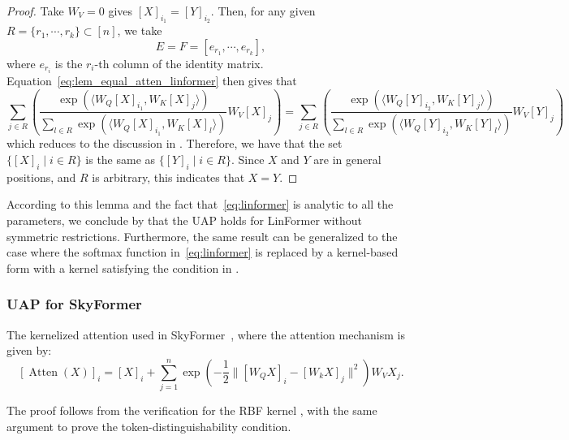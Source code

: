 \documentclass{article}
\begin{document}
\begin{proof}
    Take $W_V=0$ gives $[X]_{i_1}=[Y]_{i_2}$. Then, for any given $R=\{r_1,\cdots, r_k\}\subset [n]$, we take
    \begin{equation}
        E=F=[e_{r_1},\cdots, e_{r_k}],
    \end{equation}
    where $e_{r_i}$ is the $r_i$-th column of the identity matrix. Equation~\eqref{eq:lem_equal_atten_linformer} then gives that
    \begin{equation}
        \sum_{j\in R}\left(\frac{ \exp(\langle W_Q [X]_{i_1}, W_K [X]_j\rangle)}{\sum_{l\in R} \exp(\langle W_Q [X]_{i_1}, W_K [X]_l\rangle)} W_V [X]_j \right) =          \sum_{j\in R}\left(\frac{ \exp(\langle W_Q [Y]_{i_2}, W_K [Y]_j\rangle)}{\sum_{l\in R} \exp(\langle W_Q [Y]_{i_2}, W_K [Y]_l\rangle)} W_V [Y]_j \right)
    \end{equation}
    which reduces to the discussion in . Therefore, we have that the set $\{[X]_{i}\mid i\in R\}$ is the same as $\{[Y]_{i}\mid i\in R\}$. Since $X$ and $Y$ are in general positions, and $R$ is arbitrary, this indicates that $X=Y$.
\end{proof}

According to this lemma and the fact that~\eqref{eq:linformer} is analytic to all the parameters, we conclude by  that the UAP holds for LinFormer without symmetric restrictions. Furthermore, the same result can be generalized to the case where the softmax function in~\eqref{eq:linformer} is replaced by a kernel-based form with a kernel satisfying the condition in .

\subsubsection{UAP for SkyFormer}
 The kernelized attention used in SkyFormer~\cite{chen2021skyformer}, where the attention mechanism is given by:
    \begin{equation}
        \label{eq:skyformer}
        [\operatorname{Atten}(X)]_i=[X]_i + \sum_{j=1}^n \exp{\left(-\frac{1}{2}\|[W_QX]_i-[W_kX]_j\|^2\right)}W_VX_j.
    \end{equation}

The proof follows from the verification for the RBF kernel , with the same argument to prove the token-distinguishability condition.
\end{document}
